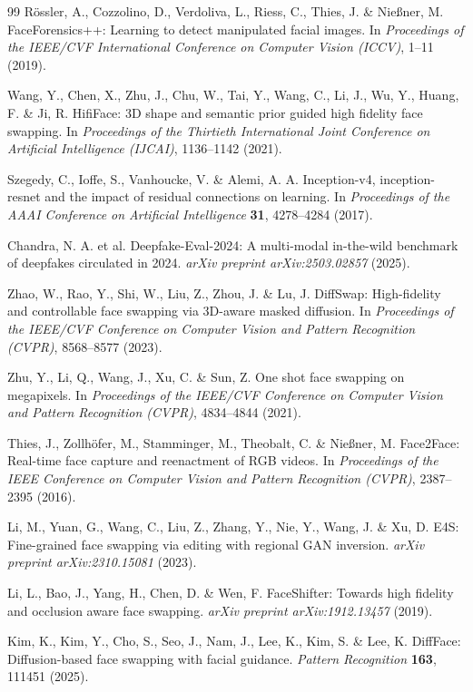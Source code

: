 \documentclass[fleqn,10pt]{wlscirep}
\begin{document}
\begin{thebibliography}{99}
 Rössler, A., Cozzolino, D., Verdoliva, L., Riess, C., Thies, J. \& Nießner, M. FaceForensics++: Learning to detect manipulated facial images. In \textit{Proceedings of the IEEE/CVF International Conference on Computer Vision (ICCV)}, 1--11 (2019).

 Wang, Y., Chen, X., Zhu, J., Chu, W., Tai, Y., Wang, C., Li, J., Wu, Y., Huang, F. \& Ji, R. HifiFace: 3D shape and semantic prior guided high fidelity face swapping. In \textit{Proceedings of the Thirtieth International Joint Conference on Artificial Intelligence (IJCAI)}, 1136--1142 (2021).

 Szegedy, C., Ioffe, S., Vanhoucke, V. \& Alemi, A. A. Inception-v4, inception-resnet and the impact of residual connections on learning. In \textit{Proceedings of the AAAI Conference on Artificial Intelligence} \textbf{31}, 4278--4284 (2017).

 Chandra, N. A. et al. Deepfake-Eval-2024: A multi-modal in-the-wild benchmark of deepfakes circulated in 2024. \textit{arXiv preprint arXiv:2503.02857} (2025).

 Zhao, W., Rao, Y., Shi, W., Liu, Z., Zhou, J. \& Lu, J. DiffSwap: High-fidelity and controllable face swapping via 3D-aware masked diffusion. In \textit{Proceedings of the IEEE/CVF Conference on Computer Vision and Pattern Recognition (CVPR)}, 8568--8577 (2023).

 Zhu, Y., Li, Q., Wang, J., Xu, C. \& Sun, Z. One shot face swapping on megapixels. In \textit{Proceedings of the IEEE/CVF Conference on Computer Vision and Pattern Recognition (CVPR)}, 4834--4844 (2021).

 Thies, J., Zollhöfer, M., Stamminger, M., Theobalt, C. \& Nießner, M. Face2Face: Real-time face capture and reenactment of RGB videos. In \textit{Proceedings of the IEEE Conference on Computer Vision and Pattern Recognition (CVPR)}, 2387--2395 (2016).

 Li, M., Yuan, G., Wang, C., Liu, Z., Zhang, Y., Nie, Y., Wang, J. \& Xu, D. E4S: Fine-grained face swapping via editing with regional GAN inversion. \textit{arXiv preprint arXiv:2310.15081} (2023).

 Li, L., Bao, J., Yang, H., Chen, D. \& Wen, F. FaceShifter: Towards high fidelity and occlusion aware face swapping. \textit{arXiv preprint arXiv:1912.13457} (2019).

 Kim, K., Kim, Y., Cho, S., Seo, J., Nam, J., Lee, K., Kim, S. \& Lee, K. DiffFace: Diffusion-based face swapping with facial guidance. \textit{Pattern Recognition} \textbf{163}, 111451 (2025).


\end{thebibliography}
\end{document}
